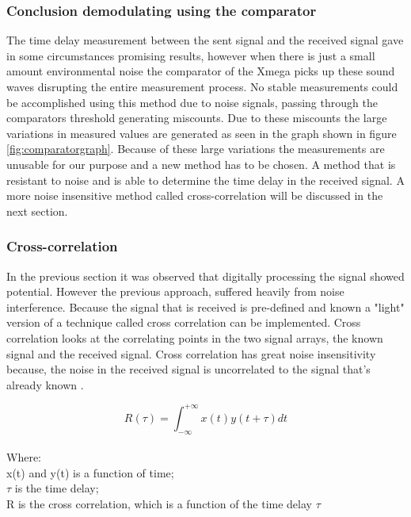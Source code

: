 \documentclass[10pt,a4paper]{article}
\begin{document}
\subsubsection{Conclusion demodulating using the comparator}
The time delay measurement between the sent signal and the received signal gave in some circumstances promising results, however when there is just a small amount environmental noise the comparator of the Xmega picks up these sound waves disrupting the entire measurement process. No stable measurements could be accomplished using this method due to noise signals, passing through the comparators threshold generating miscounts. Due to these miscounts the large variations in measured values are generated as seen in the graph shown in figure \ref{fig:comparatorgraph}. Because of these large variations the measurements are unusable for our purpose and a new method has to be chosen. A method that is resistant to noise and is able to determine the time delay in the received signal. A more noise insensitive method called cross-correlation will be discussed in the next section.


\subsubsection{Cross-correlation}
In the previous section it was observed that digitally processing the signal showed potential. However the previous approach, suffered heavily from noise interference. Because the signal that is received is pre-defined and known a "light" version of a technique called cross correlation can be implemented. Cross correlation looks at the correlating points in the two signal arrays, the known signal and the received signal. Cross correlation has great noise insensitivity because, the noise in the received signal is uncorrelated to the signal that's already known \cite{crosscorrelation1}. 
 


\begin{equation}
R(\tau)=\int_{-\infty}^{+\infty}x(t) y(t+\tau)dt
\label{eq:Cross-correlation}
\end{equation}
\\
Where:\\
x(t) and y(t) is a function of time;\\
$\tau$ is the time delay;\\
R is the cross correlation, which is a function of the time delay $\tau$\\
\end{document}
